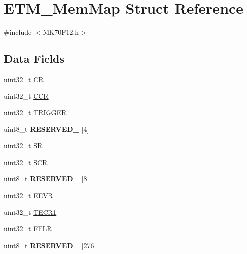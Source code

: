 \hypertarget{struct_e_t_m___mem_map}{}\section{E\+T\+M\+\_\+\+Mem\+Map Struct Reference}
\label{struct_e_t_m___mem_map}


{\ttfamily \#include $<$M\+K70\+F12.\+h$>$}

\subsection*{Data Fields}
\begin{DoxyCompactItemize}
\item 
uint32\+\_\+t \hyperlink{struct_e_t_m___mem_map_a1073427a5d49856222f104cfccad7dc9}{C\+R}
\item 
uint32\+\_\+t \hyperlink{struct_e_t_m___mem_map_ae429b2d6bbe8b448eefc4e9a19ef6435}{C\+C\+R}
\item 
uint32\+\_\+t \hyperlink{struct_e_t_m___mem_map_a0acebf95863ac9ae5ccbc9a87e48be62}{T\+R\+I\+G\+G\+E\+R}
\item 
\hypertarget{struct_e_t_m___mem_map_a46cac7e75b35d2789d910585d5b20df3}{}uint8\+\_\+t {\bfseries R\+E\+S\+E\+R\+V\+E\+D\+\_} \mbox{[}4\mbox{]}\label{struct_e_t_m___mem_map_a46cac7e75b35d2789d910585d5b20df3}

\item 
uint32\+\_\+t \hyperlink{struct_e_t_m___mem_map_af91fa67ecfbfa6eb2d20588bbf32215b}{S\+R}
\item 
uint32\+\_\+t \hyperlink{struct_e_t_m___mem_map_a21304c0be7e04790f0c022f40d2ef1aa}{S\+C\+R}
\item 
\hypertarget{struct_e_t_m___mem_map_ab49b0b2a953a291cce1b7432cfeeeb67}{}uint8\+\_\+t {\bfseries R\+E\+S\+E\+R\+V\+E\+D\+\_} \mbox{[}8\mbox{]}\label{struct_e_t_m___mem_map_ab49b0b2a953a291cce1b7432cfeeeb67}

\item 
uint32\+\_\+t \hyperlink{struct_e_t_m___mem_map_a8f38f88c8652ae9e793d53c519dd657e}{E\+E\+V\+R}
\item 
uint32\+\_\+t \hyperlink{struct_e_t_m___mem_map_a190e1e7ffbcf9b1b6c6d543aa4e1fbc4}{T\+E\+C\+R1}
\item 
uint32\+\_\+t \hyperlink{struct_e_t_m___mem_map_ad9b815d0f98a1553e6ca965a2d0c2264}{F\+F\+L\+R}
\item 
\hypertarget{struct_e_t_m___mem_map_af6a524eec61c4af4c908a4932893ed47}{}uint8\+\_\+t {\bfseries R\+E\+S\+E\+R\+V\+E\+D\+\_} \mbox{[}276\mbox{]}\label{struct_e_t_m___mem_map_af6a524eec61c4af4c908a4932893ed47}


\end{DoxyCompactItemize}
